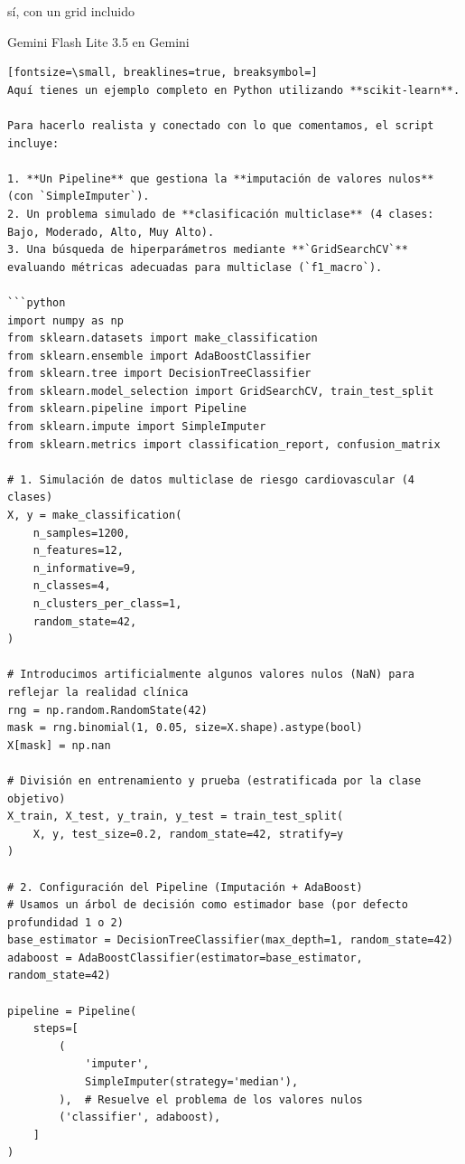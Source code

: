 \documentclass[12pt,a4paper,oneside]{book}
\begin{document}
\begin{iaprompt}
sí, con un grid incluido
\end{iaprompt}
\begin{iaresp}{Gemini Flash Lite 3.5 en Gemini}
\begin{Verbatim}[fontsize=\small, breaklines=true, breaksymbol=]
Aquí tienes un ejemplo completo en Python utilizando **scikit-learn**.

Para hacerlo realista y conectado con lo que comentamos, el script incluye:

1. **Un Pipeline** que gestiona la **imputación de valores nulos** (con `SimpleImputer`).
2. Un problema simulado de **clasificación multiclase** (4 clases: Bajo, Moderado, Alto, Muy Alto).
3. Una búsqueda de hiperparámetros mediante **`GridSearchCV`** evaluando métricas adecuadas para multiclase (`f1_macro`).

```python
import numpy as np
from sklearn.datasets import make_classification
from sklearn.ensemble import AdaBoostClassifier
from sklearn.tree import DecisionTreeClassifier
from sklearn.model_selection import GridSearchCV, train_test_split
from sklearn.pipeline import Pipeline
from sklearn.impute import SimpleImputer
from sklearn.metrics import classification_report, confusion_matrix

# 1. Simulación de datos multiclase de riesgo cardiovascular (4 clases)
X, y = make_classification(
    n_samples=1200,
    n_features=12,
    n_informative=9,
    n_classes=4,
    n_clusters_per_class=1,
    random_state=42,
)

# Introducimos artificialmente algunos valores nulos (NaN) para reflejar la realidad clínica
rng = np.random.RandomState(42)
mask = rng.binomial(1, 0.05, size=X.shape).astype(bool)
X[mask] = np.nan

# División en entrenamiento y prueba (estratificada por la clase objetivo)
X_train, X_test, y_train, y_test = train_test_split(
    X, y, test_size=0.2, random_state=42, stratify=y
)

# 2. Configuración del Pipeline (Imputación + AdaBoost)
# Usamos un árbol de decisión como estimador base (por defecto profundidad 1 o 2)
base_estimator = DecisionTreeClassifier(max_depth=1, random_state=42)
adaboost = AdaBoostClassifier(estimator=base_estimator, random_state=42)

pipeline = Pipeline(
    steps=[
        (
            'imputer',
            SimpleImputer(strategy='median'),
        ),  # Resuelve el problema de los valores nulos
        ('classifier', adaboost),
    ]
)


\end{Verbatim}
\end{iaresp}
\end{document}
